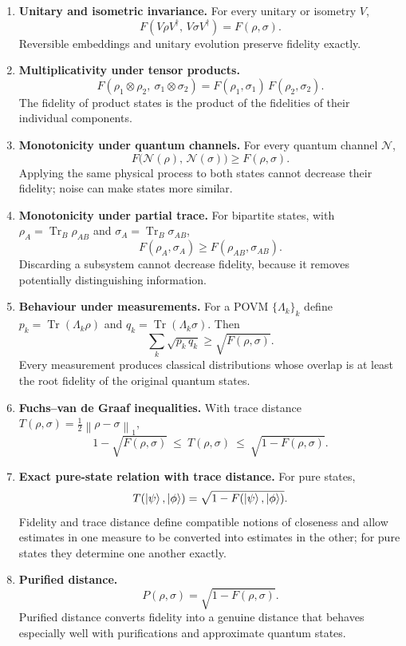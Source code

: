 \documentclass[11pt]{article}
\newcommand{\Tr}{\operatorname{Tr}}
\newcommand{\onenorm}[1]{\left\lVert #1 \right\rVert_{1}}
\begin{document}
\begin{enumerate}[label=\textbf{\arabic*.}, leftmargin=*, itemsep=6pt]
\item \textbf{Unitary and isometric invariance.}
For every unitary or isometry $V$,
\[
F(V\rho V^{\dagger},\,V\sigma V^{\dagger}) = F(\rho,\sigma).
\]
Reversible embeddings and unitary evolution preserve fidelity exactly.

\item \textbf{Multiplicativity under tensor products.}
\[
F(\rho_1\otimes\rho_2,\ \sigma_1\otimes\sigma_2)
= F(\rho_1,\sigma_1)\,F(\rho_2,\sigma_2).
\]
The fidelity of product states is the product of the fidelities of their
individual components.

\item \textbf{Monotonicity under quantum channels.}
For every quantum channel $\mathcal{N}$,
\[
F\!\big(\mathcal{N}(\rho),\,\mathcal{N}(\sigma)\big) \ge F(\rho,\sigma).
\]
Applying the same physical process to both states cannot decrease their
fidelity; noise can make states more similar.

\item \textbf{Monotonicity under partial trace.}
For bipartite states, with $\rho_A=\Tr_B\rho_{AB}$ and $\sigma_A=\Tr_B\sigma_{AB}$,
\[
F(\rho_A,\sigma_A) \ge F(\rho_{AB},\sigma_{AB}).
\]
Discarding a subsystem cannot decrease fidelity, because it removes potentially
distinguishing information.

\item \textbf{Behaviour under measurements.}
For a POVM $\{\Lambda_k\}_k$ define $p_k=\Tr(\Lambda_k\rho)$ and
$q_k=\Tr(\Lambda_k\sigma)$. Then
\[
\sum_k \sqrt{p_k\,q_k} \ge \sqrt{F(\rho,\sigma)}.
\]
Every measurement produces classical distributions whose overlap is at least
the root fidelity of the original quantum states.

\item \textbf{Fuchs--van de Graaf inequalities.}
With trace distance $T(\rho,\sigma)=\tfrac12\onenorm{\rho-\sigma}$,
\[
1 - \sqrt{F(\rho,\sigma)} \ \le\ T(\rho,\sigma) \ \le\ \sqrt{1 - F(\rho,\sigma)}.
\]

\item \textbf{Exact pure-state relation with trace distance.}
For pure states,
\[
T(\ket{\psi},\ket{\phi}) = \sqrt{1 - F(\ket{\psi},\ket{\phi})}.
\]
Fidelity and trace distance define compatible notions of closeness and allow
estimates in one measure to be converted into estimates in the other; for pure
states they determine one another exactly.

\item \textbf{Purified distance.}
\[
P(\rho,\sigma) = \sqrt{1 - F(\rho,\sigma)}.
\]
Purified distance converts fidelity into a genuine distance that behaves
especially well with purifications and approximate quantum states.


\end{enumerate}
\end{document}
